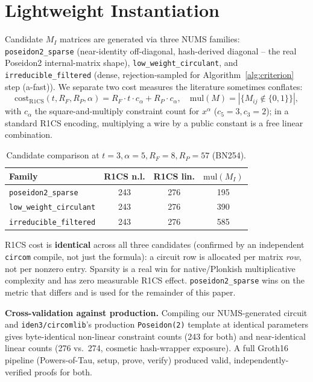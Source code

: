 \documentclass[conference]{IEEEtran}
\theoremstyle{definition}
\theoremstyle{plain}
\begin{document}
\section{Lightweight Instantiation}
\label{sec:lightweight}

Candidate $M_I$ matrices are generated via three NUMS families:
\texttt{poseidon2\_sparse} (near-identity off-diagonal, hash-derived
diagonal -- the real Poseidon2 internal-matrix shape),
\texttt{low\_weight\_circulant}, and \texttt{irreducible\_filtered}
(dense, rejection-sampled for Algorithm~\ref{alg:criterion} step
(a-fast)). We separate two cost measures the literature sometimes
conflates:
\[
  \mathrm{cost}_{\mathrm{R1CS}}(t,R_F,R_P,\alpha)=R_F\cdot t\cdot
  c_\alpha+R_P\cdot c_\alpha,\quad
  \mathrm{mul}(M)=|\{M_{ij}\notin\{0,1\}\}|,
\]
with $c_\alpha$ the square-and-multiply constraint count for
$x^\alpha$ ($c_5=3,c_3=2$); in a standard R1CS encoding, multiplying a
wire by a public constant is a free linear combination.

\begin{table}[t]
\centering
\caption{Candidate comparison at $t=3,\alpha=5,R_F=8,R_P=57$ (BN254).}
\label{tab:candidates}
\small
\begin{tabular}{@{}lccc@{}}
\toprule
Family & R1CS n.l. & R1CS lin. & $\mathrm{mul}(M_I)$ \\
\midrule
\texttt{poseidon2\_sparse} & 243 & 276 & 195 \\
\texttt{low\_weight\_circulant} & 243 & 276 & 390 \\
\texttt{irreducible\_filtered} & 243 & 276 & 585 \\
\bottomrule
\end{tabular}
\end{table}

R1CS cost is \textbf{identical} across all three candidates (confirmed by
an independent \texttt{circom} compile, not just the formula): a
circuit row is allocated per matrix \emph{row}, not per nonzero entry.
Sparsity is a real win for native/Plonkish multiplicative complexity and
has zero measurable R1CS effect. \texttt{poseidon2\_sparse} wins on the
metric that differs and is used for the remainder of this paper.

\textbf{Cross-validation against production.} Compiling our
NUMS-generated circuit and \texttt{iden3/circomlib}'s production
\texttt{Poseidon(2)} template at identical parameters gives
byte-identical non-linear constraint counts (243 for both) and
near-identical linear counts (276 vs.\ 274, cosmetic hash-wrapper
exposure). A full Groth16 pipeline (Powers-of-Tau, setup, prove, verify)
produced valid, independently-verified proofs for both.
\end{document}
